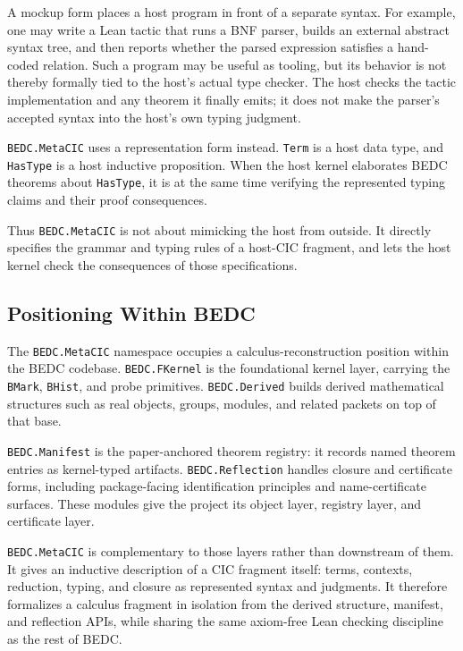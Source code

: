 A mockup form places a host program in front of a separate syntax. For example,
one may write a Lean tactic that runs a BNF parser, builds an external abstract
syntax tree, and then reports whether the parsed expression satisfies a
hand-coded relation. Such a program may be useful as tooling, but its behavior
is not thereby formally tied to the host's actual type checker. The host checks
the tactic implementation and any theorem it finally emits; it does not make
the parser's accepted syntax into the host's own typing judgment.

\texttt{BEDC.MetaCIC} uses a representation form instead. \texttt{Term} is a
host data type, and \texttt{HasType} is a host inductive proposition. When the
host kernel elaborates BEDC theorems about \texttt{HasType}, it is at the same
time verifying the represented typing claims and their proof consequences.

Thus \texttt{BEDC.MetaCIC} is not about mimicking the host from outside. It
directly specifies the grammar and typing rules of a host-CIC fragment, and
lets the host kernel check the consequences of those specifications.

\subsection{Positioning Within BEDC}\label{subsec:reconstruction-positioning}

The \texttt{BEDC.MetaCIC} namespace occupies a calculus-reconstruction
position within the BEDC codebase. \texttt{BEDC.FKernel} is the foundational
kernel layer, carrying the \texttt{BMark}, \texttt{BHist}, and probe
primitives. \texttt{BEDC.Derived} builds derived mathematical structures such
as real objects, groups, modules, and related packets on top of that base.

\texttt{BEDC.Manifest} is the paper-anchored theorem registry: it records
named theorem entries as kernel-typed artifacts. \texttt{BEDC.Reflection}
handles closure and certificate forms, including package-facing
identification principles and name-certificate surfaces. These modules give
the project its object layer, registry layer, and certificate layer.

\texttt{BEDC.MetaCIC} is complementary to those layers rather than downstream
of them. It gives an inductive description of a CIC fragment itself: terms,
contexts, reduction, typing, and closure as represented syntax and judgments.
It therefore formalizes a calculus fragment in isolation from the derived
structure, manifest, and reflection APIs, while sharing the same axiom-free
Lean checking discipline as the rest of BEDC.


